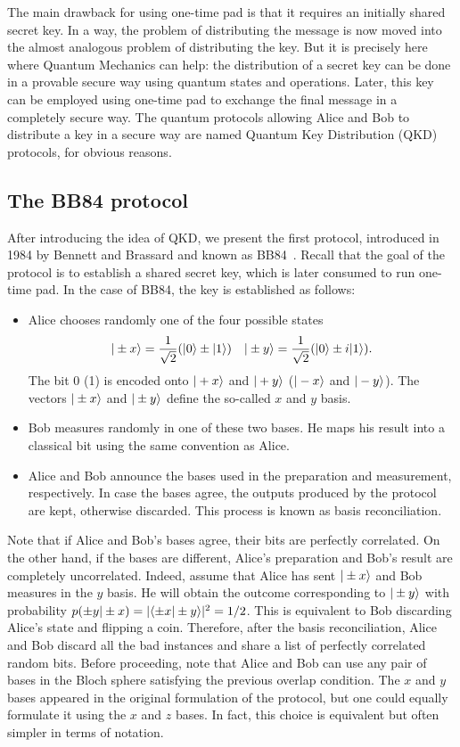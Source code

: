 \documentclass[a4paper]{article}
\begin{document}
The main drawback for using one-time pad is that it requires an
initially shared secret key. In a way, the problem of distributing
the message is now moved into the almost analogous problem of
distributing the key. But it is precisely here where Quantum
Mechanics can help: the distribution of a secret key can be done
in a provable secure way using quantum states and operations.
Later, this key can be employed using one-time pad to exchange the
final message in a completely secure way. The quantum protocols
allowing Alice and Bob to distribute a key in a secure way are named Quantum Key
Distribution (QKD) protocols, for obvious reasons.

\subsection{The BB84 protocol}

After introducing the idea of QKD,
we present the first protocol, introduced in 1984 by Bennett
and Brassard and known as BB84~\cite{BB84}. Recall that the goal
of the protocol is to establish a shared secret key, which is
later consumed to run one-time pad. In
the case of BB84, the key is established as follows:
\begin{itemize}
    \item Alice chooses randomly one of the four possible states
    \begin{equation}\label{bb84enc}
    |\pm x\rangle=\frac{1}{\sqrt 2}(|0\rangle\pm|1\rangle)\quad
    |\pm y\rangle=\frac{1}{\sqrt 2}(|0\rangle\pm i|1\rangle) .
\end{equation}
The bit 0 (1) is encoded onto $|+x\rangle$ and $|+y\rangle$
($|-x\rangle$ and $|-y\rangle$). The vectors $|\pm x\rangle$ and
$|\pm y\rangle$ define the so-called $x$ and $y$ basis.
    \item Bob measures randomly in one of these two bases. He
    maps his result into a classical bit using the same convention
    as Alice.
    \item Alice and Bob announce the bases used in the preparation and measurement, respectively. In
    case the bases agree, the
    outputs produced by the protocol are kept, otherwise discarded. This process is known as basis
    reconciliation.
\end{itemize}
Note that if Alice and Bob's bases agree, their bits are perfectly
correlated. On the other hand, if the bases are different, Alice's
preparation and Bob's result are completely uncorrelated. Indeed,
assume that Alice has sent $|\pm x\rangle$ and Bob measures in the
$y$ basis. He will obtain the outcome corresponding to $|\pm y\rangle$
with probability $p(\pm y|\pm x)=|\langle \pm x|\pm y\rangle|^2=1/2$. 
This is equivalent to Bob discarding Alice's state and flipping a coin.
Therefore, after the basis reconciliation, Alice and Bob discard
all the bad instances and share a list of perfectly correlated
random bits. Before proceeding, note that Alice and Bob can use any pair of bases in the Bloch sphere satisfying the previous overlap condition. The $x$ and $y$ bases appeared in the original formulation of the protocol, but one could equally formulate it using the $x$ and $z$ bases. In fact, this choice is equivalent but often simpler in terms of notation.
\end{document}
